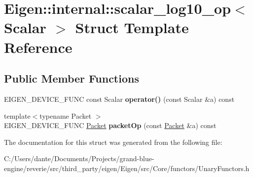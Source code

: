 \hypertarget{struct_eigen_1_1internal_1_1scalar__log10__op}{}\section{Eigen\+::internal\+::scalar\+\_\+log10\+\_\+op$<$ Scalar $>$ Struct Template Reference}
\label{struct_eigen_1_1internal_1_1scalar__log10__op}
\subsection*{Public Member Functions}
\begin{DoxyCompactItemize}
\item 
\mbox{\label{struct_eigen_1_1internal_1_1scalar__log10__op_a3c8821c91756cbc91df0302e6137e9fc}} 
E\+I\+G\+E\+N\+\_\+\+D\+E\+V\+I\+C\+E\+\_\+\+F\+U\+NC const Scalar {\bfseries operator()} (const Scalar \&a) const
\item 
\mbox{\label{struct_eigen_1_1internal_1_1scalar__log10__op_a4463e406dacc75a57e8fbd6557ae9afc}} 
{\footnotesize template$<$typename Packet $>$ }\\E\+I\+G\+E\+N\+\_\+\+D\+E\+V\+I\+C\+E\+\_\+\+F\+U\+NC \mbox{\hyperlink{union_eigen_1_1internal_1_1_packet}{Packet}} {\bfseries packet\+Op} (const \mbox{\hyperlink{union_eigen_1_1internal_1_1_packet}{Packet}} \&a) const
\end{DoxyCompactItemize}


The documentation for this struct was generated from the following file\+:\begin{DoxyCompactItemize}
\item 
C\+:/\+Users/dante/\+Documents/\+Projects/grand-\/blue-\/engine/reverie/src/third\+\_\+party/eigen/\+Eigen/src/\+Core/functors/Unary\+Functors.\+h\end{DoxyCompactItemize}
